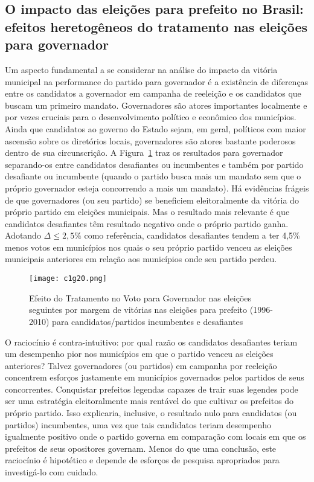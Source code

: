 \subsection{O impacto das eleições para prefeito no Brasil: efeitos heretogêneos do tratamento nas eleições para governador}

Um aspecto fundamental a se considerar na análise do impacto da vitória municipal na performance do partido para governador é a existência de diferenças entre os candidatos a governador em campanha de reeleição e os candidatos que buscam um primeiro mandato. Governadores são atores importantes localmente e por vezes cruciais para o desenvolvimento político e econômico dos municípios. Ainda que candidatos ao governo do Estado sejam, em geral, políticos com maior ascensão sobre os diretórios locais, governadores são atores bastante poderosos dentro de sua circunscrição. A Figura~\ref{fig:c1g20} traz os resultados para governador separando-os entre candidatos desafiantes ou incumbentes e também por partido desafiante ou incumbente (quando o partido busca mais um mandato sem que o próprio governador esteja concorrendo a mais um mandato). Há evidências frágeis de que governadores (ou seu partido) se beneficiem eleitoralmente da vitória do próprio partido em eleições municipais. Mas o resultado mais relevante é que candidatos desafiantes têm resultado negativo onde o próprio partido ganha. Adotando $\Delta \leq 2,5\%$ como referência, candidatos desafiantes tendem a ter 4,5\% menos votos em municípios nos quais o seu próprio partido venceu as eleições municipais anteriores em relação aos municípios onde seu partido perdeu. 

\begin{figure}[htp]
	\centering
	\texttt{[image: c1g20.png]}
	\caption{Efeito do Tratamento no Voto para Governador nas eleições seguintes por margem de vitórias nas eleições para prefeito (1996-2010) para candidatos/partidos incumbentes e desafiantes}
	\label{fig:c1g20} 
\end{figure}

O raciocínio é contra-intuitivo: por qual razão os candidatos desafiantes teriam um desempenho pior nos municípios em que o partido venceu as eleições anteriores? Talvez governadores (ou partidos) em campanha por reeleição concentrem esforços justamente em municípios governados pelos partidos de seus concorrentes. Conquistar prefeitos legendas capazes de trair suas legendes pode ser uma estratégia eleitoralmente mais rentável do que cultivar os prefeitos do próprio partido. Isso explicaria, inclusive, o resultado nulo para candidatos (ou partidos) incumbentes, uma vez que tais candidatos teriam desempenho igualmente positivo onde o partido governa em comparação com locais em que os prefeitos de seus opositores governam. Menos do que uma conclusão, este raciocínio é hipotético e depende de esforços de pesquisa apropriados para investigá-lo com cuidado.

